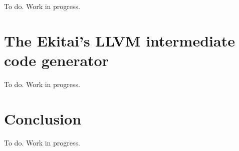\documentclass[
  oneside,
  english,
  coorientadorbanca,
  noabntexcite
]{ufsc-thesis-rn46-2019}
\begin{document}
To do. Work in progress.

\section{The Ekitai's LLVM intermediate code generator}

To do. Work in progress.

\section{Conclusion}

To do. Work in progress.


\postextual{}

\printbibliography{}
\end{document}
